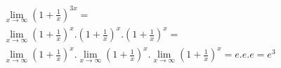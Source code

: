 \begin{ex}
\begin{align}
&\lim_{x\rightarrow \infty} \left(1+\frac{1}{x}\right)^{3x}=\nonumber\\
&\lim_{x\rightarrow \infty}
\left(1+\frac{1}{x}\right)^{x}.\left(1+\frac{1}{x}\right)^{x}.\left(1+\frac{1}{x}\right)^{x}=\nonumber\\
&\lim_{x\rightarrow \infty} \left(1+\frac{1}{x}\right)^{x}.\lim_{x\rightarrow \infty} \left(1+\frac{1}{x}\right)^{x}.\lim_{x\rightarrow \infty} \left(1+\frac{1}{x}\right)^{x}= e.e.e =e^3\nonumber
\end{align}
\end{ex}
